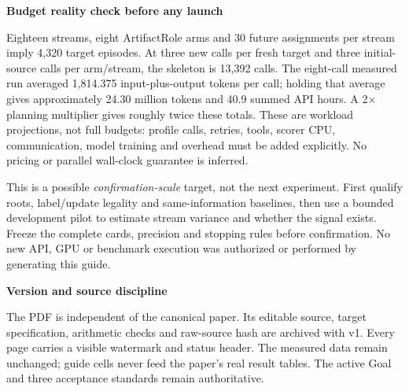 \documentclass[10pt,a4paper]{article}
\newcommand{\lead}[1]{\vspace{4pt}\textbf{#1}\par}
\begin{document}
\lead{Budget reality check before any launch}
Eighteen streams, eight ArtifactRole arms and 30 future assignments per stream
imply 4,320 target episodes. At three new calls per fresh target and three
initial-source calls per arm/stream, the skeleton is 13,392 calls.
The eight-call measured run averaged 1,814.375 input-plus-output tokens per call;
holding that average gives approximately 24.30 million tokens and
40.9 summed API hours. A 2$\times$ planning multiplier gives roughly twice
these totals. These are workload projections, not full budgets: profile calls,
retries, tools, scorer CPU, communication, model training and overhead must be
added explicitly. No pricing or parallel wall-clock guarantee is inferred.

This is a possible \emph{confirmation-scale} target, not the next experiment.
First qualify roots, label/update legality and same-information baselines, then
use a bounded development pilot to estimate stream variance and whether the
signal exists. Freeze the complete cards, precision and stopping rules before
confirmation. No new API, GPU or benchmark execution was authorized or performed
by generating this guide.

\lead{Version and source discipline}
The PDF is independent of the canonical paper. Its editable source, target
specification, arithmetic checks and raw-source hash are archived with v1.
Every page carries a visible watermark and status header. The measured data
remain unchanged; guide cells never feed the paper's real result tables.
The active Goal and three acceptance standards remain authoritative.
\end{document}
